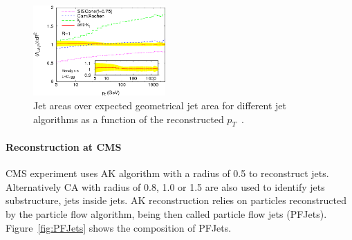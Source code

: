 \begin{figure}[!Hhtbp]
  \begin{center}
    \includegraphics[width=0.45\textwidth]{figs/JetArea.png}
    \caption{Jet areas over expected geometrical jet area for different jet algorithms as a function of the reconstructed $p_{T}$~\cite{Cacciari:2008gp}.}
    \label{fig:JetsAlgosArea}
  \end{center}
\end{figure}

\paragraph{Reconstruction at CMS}

CMS experiment uses AK algorithm with a radius of 0.5 to reconstruct jets. Alternatively CA with radius of 0.8, 1.0 or 1.5 are also used to identify jets substructure, jets inside jets. AK reconstruction relies on particles reconstructed by the particle flow algorithm, being then called particle flow jets (PFJets). Figure~\ref{fig:PFJets} shows the composition of PFJets.  

